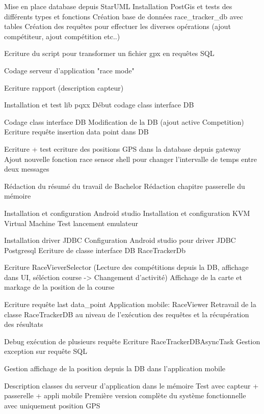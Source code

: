 \begin{multicols}{2}
Mise en place database depuis StarUML
Installation PostGis et tests des différents types et fonctions
Création base de données race\_tracker\_db avec tables
Création des requêtes pour effectuer les diverses opérations (ajout compétiteur, ajout compétition etc..)

Ecriture du script pour transformer un fichier gpx en requêtes SQL

Codage serveur d'application "race mode"

Ecriture rapport (description capteur)

Installation et test lib pqxx
Début codage class interface DB

Codage class interface DB
Modification de la DB (ajout active Competition)
Ecriture requête insertion data point dans DB

Ecriture + test ecriture des positions GPS dans la database depuis gateway
Ajout nouvelle fonction race sensor shell pour changer l’intervalle de temps entre deux messages

Rédaction du résumé du travail de Bachelor
Rédaction chapitre passerelle du mémoire

Installation et configuration Android studio
Installation et configuration KVM Virtual Machine
Test lancement emulateur

Installation driver JDBC
Configuration Android studio pour driver JDBC Postgresql
Ecriture de classe interface DB RaceTrackerDb

Ecriture RaceVieverSelector (Lecture des compétitions depuis la DB, affichage dans UI, séléction course -> Changement d’activité)
Affichage de la carte et markage de la position de la course

Ecriture requête last data\_point
Application mobile: RaceViewer
Retravail de la classe RaceTrackerDB au niveau de l’exécution des requêtes et la récupération des résultats

Debug exécution de plusieurs requête
Ecriture RaceTrackerDBAsyncTask
Gestion exception sur requête SQL

Gestion affichage de la position depuis la DB dans l’application mobile

Description classes du serveur d’application dans le mémoire
Test avec capteur + passerelle + appli mobile
Première version complète du système fonctionnelle avec uniquement position GPS


\end{multicols}
